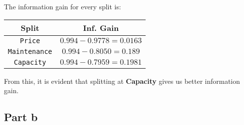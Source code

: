 \documentclass{article}
\begin{document}
\begin{flushleft}
The information gain for every split is:
\begin{center}
\begin{tabular}{|c|c|}
\hline
Split & Inf. Gain \\
\hline
\texttt{Price} & \(0.994 - 0.9778 = 0.0163\) \\
\hline
\texttt{Maintenance} & \(0.994 - 0.8050 = 0.189\) \\
\hline
\texttt{Capacity} & \(0.994 - 0.7959 = 0.1981\) \\
\hline 
\end{tabular}
\end{center}

From this, it is evident that splitting at \textbf{Capacity} gives us better information gain.
\end{flushleft}
\subsection*{Part b}
\end{document}
